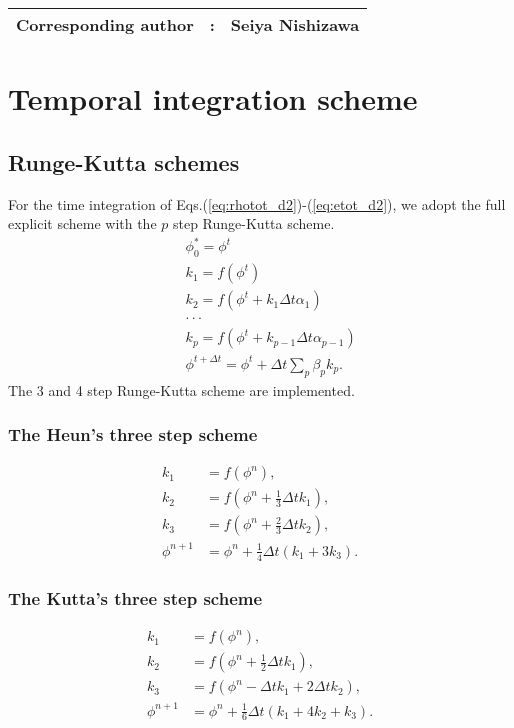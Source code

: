 {\bf \Large
\begin{tabular}{ccc}
\hline
  Corresponding author & : & Seiya Nishizawa\\
\hline
\end{tabular}
}

\section{Temporal integration scheme}

\subsection{Runge-Kutta schemes}

For the time integration of Eqs.(\ref{eq:rhotot_d2})-(\ref{eq:etot_d2}),
we adopt the full explicit scheme with
the $p$ step Runge-Kutta scheme.
\begin{eqnarray}
&& \phi^{*}_{0} = \phi^{t}\\
&& k_1 = f(\phi^t) \\
&& k_2 = f(\phi^t + k_1 \Delta t \alpha_1) \\
&&  \cdot \cdot \cdot\nonumber\\
&& k_p = f(\phi^t + k_{p-1} \Delta t \alpha_{p-1}) \\
&& \phi^{t+\Delta t} = \phi^t + \Delta t\sum_p \beta_p k_p.
\end{eqnarray}
The 3 and 4 step Runge-Kutta scheme are implemented.


\subsubsection{The Heun's three step scheme}

\begin{align}
  k_1 &= f(\phi^n), \\
  k_2 &= f\left(\phi^n + \frac{1}{3}\Delta t k_1\right), \\
  k_3 &= f\left(\phi^n + \frac{2}{3}\Delta t k_2\right), \\
  \phi^{n+1} &= \phi^n + \frac{1}{4}\Delta t (k_1 + 3k_3).
\end{align}


\subsubsection{The Kutta's three step scheme}

\begin{align}
  k_1 &= f(\phi^n), \\
  k_2 &= f\left(\phi^n + \frac{1}{2}\Delta t k_1\right), \\
  k_3 &= f\left(\phi^n - \Delta t k_1  + 2 \Delta t k_2\right), \\
  \phi^{n+1} &= \phi^n + \frac{1}{6}\Delta t (k_1 + 4k_2 + k_3).
\end{align}


